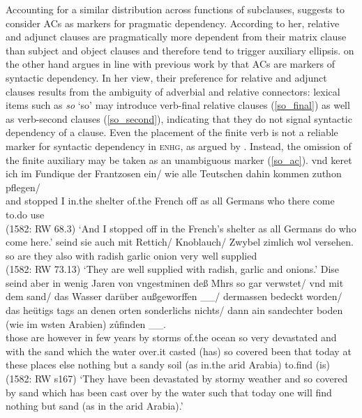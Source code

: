 \documentclass[output=paper,colorlinks,citecolor=brown]{langscibook}
\begin{document}
\largerpage
Accounting for a similar distribution across functions of subclauses, \citet[139--141]{breitbarth2005} suggests to consider ACs as markers for pragmatic dependency. According to her, relative and adjunct clauses are pragmatically more dependent from their matrix clause than subject and object clauses and therefore tend to trigger auxiliary ellipsis. \citet{demske90} on the other hand argues in line with previous work by \citet{admoni67} that ACs are markers of syntactic dependency. In her view, their preference for relative and adjunct clauses results from the ambiguity of adverbial and relative connectors: lexical items such as \textit{so} `so' may introduce verb-final relative clauses (\ref{so_final}) as well as verb-second clauses (\ref{so_second}), indicating that they do not signal syntactic dependency of a clause. Even the placement of the finite verb is not a reliable marker for syntactic dependency in \textsc{enhg}, as argued by \textcite{demske2018}. Instead, the omission of the finite auxiliary may be taken as an unambiguous marker (\ref{so_ac}).   
\eal
\ex \label{so_final}
\gll vnd keret ich im Fundique der Frantzosen ein/ wie alle Teutschen  dahin kommen zuthon pflegen/ \\ and stopped I in.the shelter {of.the} French off as all Germans who there come to.do use   \\ \hfill (1582: RW 68.3)
\glt `And I stopped off in the French's shelter as all Germans do who come here.'
\ex \label{so_second}
\gll {} seind sie auch mit Rettich/ Knoblauch/ Zwybel zimlich wol versehen.\\ so are they also with radish garlic onion very well supplied   \\ \hfill (1582: RW 73.13)
\glt `They are well supplied with radish, garlic and onions.'
\ex \label{so_ac}
\gll  Dise seind aber in wenig Jaren von vngest\oldue{}minen deß M\oldoe{}hrs so gar verw\oldue{}stet/ vnd mit dem sand/  das Wasser darüber außgeworffen \_\_/ dermassen bedeckt worden/ das {heütigs tags} an denen orten sonderlichs nichts/ dann ain sandechter boden (wie im w\oldue{}sten Arabien) z\r{u}finden \_\_. \\ those are however in few years by storms of.the ocean so very devastated and with the sand which the water over.it casted (has) so covered been that today at these places else nothing but a sandy soil (as in.the arid Arabia) to.find (is)  \\  \hfill (1582: RW s167)
\glt `They have been devastated by stormy weather and so covered by sand which has been cast over by the water such that today one will find nothing but sand (as in the arid Arabia).'
\zl
\end{document}
